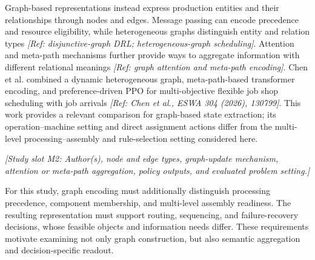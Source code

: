 Graph-based representations instead express production entities and their relationships through nodes
and edges. Message passing can encode precedence and resource eligibility, while heterogeneous graphs
distinguish entity and relation types \textit{[Ref: disjunctive-graph DRL; heterogeneous-graph scheduling]}.
Attention and meta-path mechanisms further provide ways to aggregate information with different
relational meanings \textit{[Ref: graph attention and meta-path encoding]}. Chen et al.
combined a dynamic heterogeneous graph, meta-path-based transformer encoding, and preference-driven
PPO for multi-objective flexible job shop scheduling with job arrivals \textit{[Ref: Chen et al.,
ESWA 304 (2026), 130799]}. This work provides a relevant comparison for graph-based state extraction;
its operation--machine setting and direct assignment actions differ from the multi-level processing--assembly
and rule-selection setting considered here.


\textit{[Study slot M2: Author(s), node and edge types, graph-update mechanism, attention or meta-path aggregation,
policy outputs, and evaluated problem setting.]}

For this study, graph encoding must additionally distinguish processing precedence, component membership,
and multi-level assembly readiness. The resulting representation must support routing, sequencing,
and failure-recovery decisions, whose feasible objects and information needs differ.
These requirements motivate examining not only graph construction, but also semantic aggregation and decision-specific readout.

